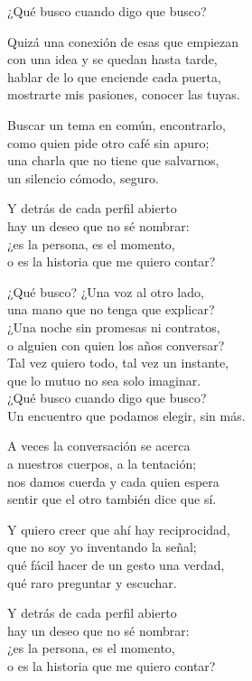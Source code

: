 \begin{lyrics}
¿Qué busco cuando digo que busco?

Quizá una conexión de esas que empiezan\\
con una idea y se quedan hasta tarde,\\
hablar de lo que enciende cada puerta,\\
mostrarte mis pasiones, conocer las tuyas.

Buscar un tema en común, encontrarlo,\\
como quien pide otro café sin apuro;\\
una charla que no tiene que salvarnos,\\
un silencio cómodo, seguro.

Y detrás de cada perfil abierto\\
hay un deseo que no sé nombrar:\\
¿es la persona, es el momento,\\
o es la historia que me quiero contar?

¿Qué busco? ¿Una voz al otro lado,\\
una mano que no tenga que explicar?\\
¿Una noche sin promesas ni contratos,\\
o alguien con quien los años conversar?\\
Tal vez quiero todo, tal vez un instante,\\
que lo mutuo no sea solo imaginar.\\
¿Qué busco cuando digo que busco?\\
Un encuentro que podamos elegir, sin más.

A veces la conversación se acerca\\
a nuestros cuerpos, a la tentación;\\
nos damos cuerda y cada quien espera\\
sentir que el otro también dice que sí.

Y quiero creer que ahí hay reciprocidad,\\
que no soy yo inventando la señal;\\
qué fácil hacer de un gesto una verdad,\\
qué raro preguntar y escuchar.

Y detrás de cada perfil abierto\\
hay un deseo que no sé nombrar:\\
¿es la persona, es el momento,\\
o es la historia que me quiero contar?


\end{lyrics}
